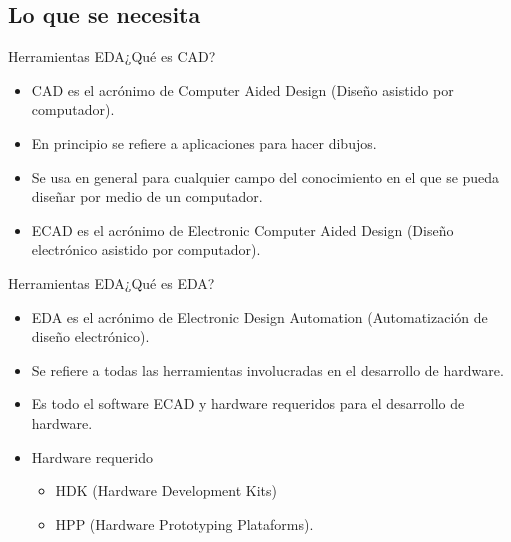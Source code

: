 \documentclass{beamer}
\begin{document}
\subsection{Lo que se necesita}

\begin{frame}{Herramientas EDA}{¿Qué es CAD?}
  \begin{itemize}
  \item CAD es el acrónimo de Computer Aided Design (Diseño asistido por computador).
  \item En principio se refiere a aplicaciones para hacer dibujos.
  \item Se usa en general para cualquier campo del conocimiento en el que se pueda diseñar por medio de un computador.
  \item ECAD es el acrónimo de Electronic Computer Aided Design (Diseño electrónico asistido por computador).
  \end{itemize}
\end{frame}

\begin{frame}{Herramientas EDA}{¿Qué es EDA?}
  \begin{itemize}
  \item EDA es el acrónimo de Electronic Design Automation (Automatización de diseño electrónico).
  \item Se refiere a todas las herramientas involucradas en el desarrollo de hardware.
  \item Es todo el software ECAD y hardware requeridos para el desarrollo de hardware.
  \item Hardware requerido
    \begin{itemize}
    \item HDK (Hardware Development Kits)
    \item HPP (Hardware Prototyping Plataforms).
    \end{itemize}
  \end{itemize}
\end{frame}
\end{document}
